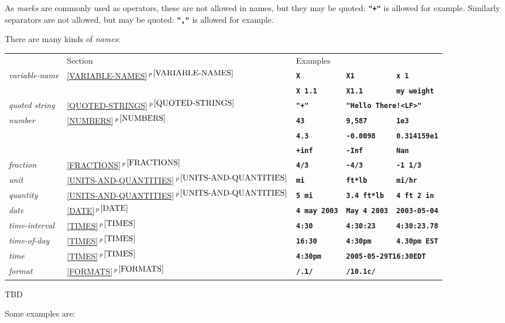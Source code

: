 \documentclass[12pt]{article}
\newcommand{\TT}[1]{{\tt \bfseries #1}}
\newcommand{\itemref}[1]{\ref{#1}$\,^{p\,\pageref{#1}}$}
\newenvironment{indpar}[1][0.3in]%
	{\begin{list}{}%
		     {\setlength{\itemsep}{0in}%
		      \setlength{\topsep}{0in}%
		      \setlength{\parsep}{1ex}%
		      \setlength{\labelwidth}{#1}%
		      \setlength{\leftmargin}{#1}%
		      \addtolength{\leftmargin}{\labelsep}}%
	 \item}%
	{\end{list}}
\begin{document}
As {\em marks} are commonly used as
operators, these are not allowed in names, but they may be quoted:
\TT{"+"} is allowed for example.  Similarly separators are not allowed,
but may be quoted: \TT{","} is allowed for example.

There are many kinds of {\em names}:
\begin{indpar}
    \begin{tabular}[t]{l@{~~~~~}llll}
          & Section & Examples \\[1ex]
      {\em variable-name}
    & \itemref{VARIABLE-NAMES}
    & \TT{X} & \TT{X1} & \TT{x 1} \\
    &
    & \TT{X 1.1} & \TT{X1.1} & \TT{my weight} \\
      {\em quoted string}
    & \itemref{QUOTED-STRINGS}
    & \TT{"+"} & \multicolumn{2}{l}{\TT{"Hello There!<LF>"}} \\
      {\em number}
    & \itemref{NUMBERS}
    & \TT{43} & \TT{9,587} & \TT{1e3} \\
    & 
    & \TT{4.3} & \TT{-0.0098} & \TT{0.314159e1} \\
    & 
    & \TT{+inf} & \TT{-Inf} & \TT{Nan} \\
      {\em fraction}
    & \itemref{FRACTIONS}
    & \TT{4/3} & \TT{-4/3} & \TT{-1 1/3} \\
      {\em unit}
    & \itemref{UNITS-AND-QUANTITIES}
    & \TT{mi} & \TT{ft*lb} & \TT{mi/hr} \\
      {\em quantity}
    & \itemref{UNITS-AND-QUANTITIES}
    & \TT{5 mi} & \TT{3.4 ft*lb} & \TT{4 ft 2 in} \\
      {\em date}
    & \itemref{DATE}
    & \TT{4 may 2003} & \TT{May 4 2003} & \TT{2003-05-04} \\
      {\em time-interval}
    & \itemref{TIMES}
    & \TT{4:30} & \TT{4:30:23} & \TT{4:30:23.78} \\
      {\em time-of-day}
    & \itemref{TIMES}
    & \TT{16:30} & \TT{4:30pm} & \TT{4.30pm EST} \\
      {\em time}
    & \itemref{TIMES}
    & \TT{4:30pm} & \multicolumn{2}{l}{\TT{2005-05-29T16:30EDT}} \\
      {\em format}
    & \itemref{FORMATS}
    & \TT{/.1/} & \TT{/10.1c/} \\

    \end{tabular}
\end{indpar}

TBD

Some examples are:
\end{document}
